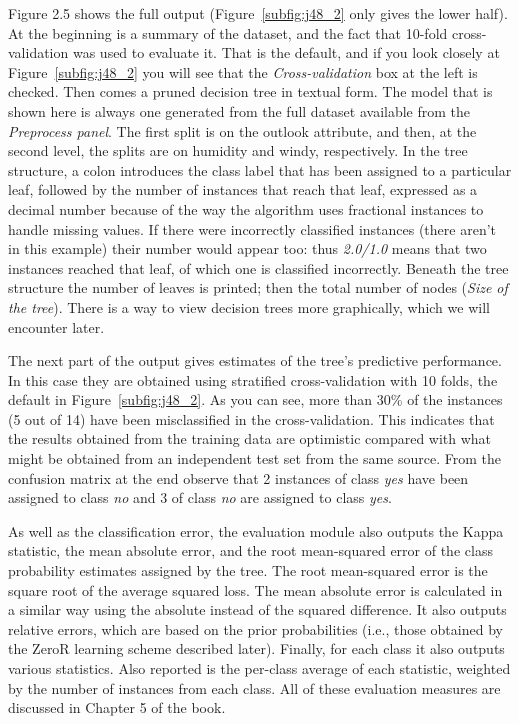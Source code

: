 Figure 2.5 shows the full output (Figure~\ref{subfig:j48_2} only gives
the lower half). At the beginning is a summary of the dataset, and the
fact that 10-fold cross-validation was used to evaluate it. That is
the default, and if you look closely at Figure~\ref{subfig:j48_2} you
will see that the \textit{Cross-validation} box at the left is
checked. Then comes a pruned decision tree in textual form. The model
that is shown here is always one generated from the full dataset
available from the \textit{Preprocess panel}. The first split is on
the outlook attribute, and then, at the second level, the splits are
on humidity and windy, respectively. In the tree structure, a colon
introduces the class label that has been assigned to a particular
leaf, followed by the number of instances that reach that leaf,
expressed as a decimal number because of the way the algorithm uses
fractional instances to handle missing values. If there were
incorrectly classified instances (there aren't in this example) their
number would appear too: thus \textit{2.0/1.0} means that two
instances reached that leaf, of which one is classified
incorrectly. Beneath the tree structure the number of leaves is
printed; then the total number of nodes (\textit{Size of the
  tree}). There is a way to view decision trees more graphically,
which we will encounter later.


The next part of the output gives estimates of the tree's predictive
performance. In this case they are obtained using stratified
cross-validation with 10 folds, the default in
Figure~\ref{subfig:j48_2}. As you can see, more than 30\% of the
instances (5 out of 14) have been misclassified in the
cross-validation. This indicates that the results obtained from the
training data are optimistic compared with what might be obtained from
an independent test set from the same source. From the confusion
matrix at the end observe that 2 instances of class \textit{yes} have
been assigned to class \textit{no} and 3 of class \textit{no} are
assigned to class \textit{yes}.

As well as the classification error, the evaluation module also
outputs the Kappa statistic, the mean absolute error, and the root
mean-squared error of the class probability estimates assigned by the
tree. The root mean-squared error is the square root of the average
squared loss. The mean absolute error is calculated in a similar way
using the absolute instead of the squared difference. It also outputs
relative errors, which are based on the prior probabilities (i.e.,
those obtained by the ZeroR learning scheme described later). Finally,
for each class it also outputs various statistics. Also reported is
the per-class average of each statistic, weighted by the number of
instances from each class. All of these evaluation measures are
discussed in Chapter 5 of the book.

